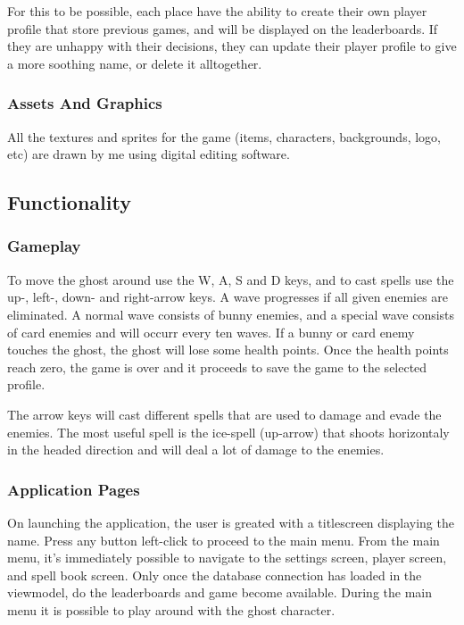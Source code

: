\documentclass[12pt]{article}
\begin{document}
        For this to be possible, each place have the ability to create their own player profile that store previous games, and will be displayed on the leaderboards. If they are unhappy with their decisions, they can update their player profile to give a more soothing name, or delete it alltogether.

        \subsubsection{Assets And Graphics}

        All the textures and sprites for the game (items, characters, backgrounds, logo, etc) are drawn by me using digital editing software.

    \subsection{Functionality}

        \subsubsection{Gameplay}

        To move the ghost around use the W, A, S and D keys, and to cast spells use the up-, left-, down- and right-arrow keys. A wave progresses if all given enemies are eliminated. A normal wave consists of bunny enemies, and a special wave consists of card enemies and will occurr every ten waves. If a bunny or card enemy touches the ghost, the ghost will lose some health points. Once the health points reach zero, the game is over and it proceeds to save the game to the selected profile. 

        The arrow keys will cast different spells that are used to damage and evade the enemies. The most useful spell is the ice-spell (up-arrow) that shoots horizontaly in the headed direction and will deal a lot of damage to the enemies.

        \subsubsection{Application Pages}

        On launching the application, the user is greated with a titlescreen displaying the name. Press any button left-click to proceed to the main menu. From the main menu, it's immediately possible to navigate to the settings screen, player screen, and spell book screen. Only once the database connection has loaded in the viewmodel, do the leaderboards and game become available. During the main menu it is possible to play around with the ghost character.
\end{document}
